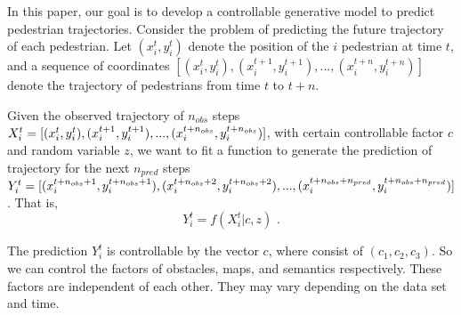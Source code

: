 In this paper, our goal is to develop a controllable generative model to predict pedestrian trajectories.
Consider the problem of predicting the future trajectory of each pedestrian. Let $(x_i^t, y_i^t)$ denote the position of the $i$ pedestrian at time $t$, and a sequence of coordinates  $[(x_i^{t}, y_i^{t}), (x_i^{t+1}, y_i^{t+1}), ..., (x_i^{t+n}, y_i^{t+n})]$ denote the trajectory of pedestrians from time $t$ to $t+n$.

Given the observed trajectory of $n_{obs}$ steps $X_i^t = [(x_i^{t}, y_i^{t}), \\ (x_i^{t+1}, y_i^{t+1}), ..., (x_i^{t+n_{obs}}, y_i^{t+n_{obs}})]$, with certain controllable factor $c$ and random variable $z$,  we want to fit a function to generate the prediction of trajectory for the next $n_{pred}$ steps $Y_i^t = [(x_i^{t+n_{obs}+1}, \\  y_i^{t+n_{obs}+1}), (x_i^{t+n_{obs}+ 2}, y_i^{t+n_{obs}+2}), ...,  (x_i^{t+n_{obs}+ n_{pred}}, y_i^{t+n_{obs}+n_{pred}})]$. That is,
$$ Y_i^t = f(X_i^t \vert c, z) \text{ .}$$

The prediction $Y_i^t$ is controllable by the vector $c$, where consist of $(c_1, c_2, c_3)$. So we can control the factors of obstacles, maps, and semantics respectively. These factors are independent of each other. They may vary depending on the data set and time.